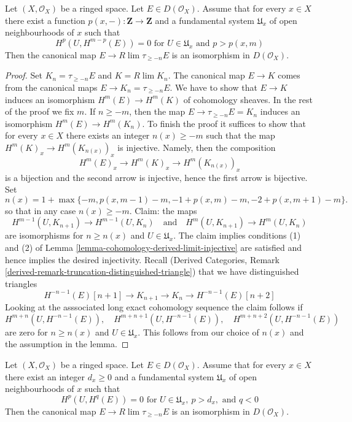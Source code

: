 \begin{lemma}
\label{lemma-is-limit-per-point}
Let $(X, \mathcal{O}_X)$ be a ringed space. Let $E \in D(\mathcal{O}_X)$.
Assume that for every $x \in X$ there exist
a function $p(x, -) : \mathbf{Z} \to \mathbf{Z}$ and
a fundamental system $\mathfrak{U}_x$ of open neighbourhoods of $x$
such that
$$
H^p(U, H^{m - p}(E)) = 0 \text{ for }
U \in \mathfrak{U}_x \text{ and } p > p(x, m)
$$
Then the canonical map $E \to R\lim \tau_{\geq -n} E$
is an isomorphism in $D(\mathcal{O}_X)$.
\end{lemma}

\begin{proof}
Set $K_n = \tau_{\geq -n}E$ and $K = R\lim K_n$.
The canonical map $E \to K$
comes from the canonical maps $E \to K_n = \tau_{\geq -n}E$.
We have to show that $E \to K$ induces an isomorphism
$H^m(E) \to H^m(K)$ of cohomology sheaves. In the rest of the
proof we fix $m$. If $n \geq -m$, then
the map $E \to \tau_{\geq -n}E = K_n$ induces an isomorphism
$H^m(E) \to H^m(K_n)$.
To finish the proof it suffices to show that for every $x \in X$
there exists an integer $n(x) \geq -m$ such that the map
$H^m(K)_x \to H^m(K_{n(x)})_x$ is injective. Namely, then
the composition
$$
H^m(E)_x \to H^m(K)_x \to H^m(K_{n(x)})_x
$$
is a bijection and the second arrow is injective, hence the
first arrow is bijective. Set
$$
n(x) = 1 + \max\{-m, p(x, m - 1) - m, -1 + p(x, m) - m, -2 + p(x, m + 1) - m\}.
$$
so that in any case $n(x) \geq -m$. Claim: the maps
$$
H^{m - 1}(U, K_{n + 1}) \to H^{m - 1}(U, K_n)
\quad\text{and}\quad
H^m(U, K_{n + 1}) \to H^m(U, K_n)
$$
are isomorphisms for $n \geq n(x)$ and $U \in \mathfrak{U}_x$.
The claim implies conditions
(1) and (2) of Lemma \ref{lemma-cohomology-derived-limit-injective}
are satisfied and hence implies the desired injectivity.
Recall (Derived Categories, Remark
\ref{derived-remark-truncation-distinguished-triangle})
that we have distinguished triangles
$$
H^{-n - 1}(E)[n + 1] \to
K_{n + 1} \to K_n \to H^{-n - 1}(E)[n + 2]
$$
Looking at the asssociated long exact cohomology sequence the claim follows if
$$
H^{m + n}(U, H^{-n - 1}(E)),\quad
H^{m + n + 1}(U, H^{-n - 1}(E)),\quad
H^{m + n + 2}(U, H^{-n - 1}(E))
$$
are zero for $n \geq n(x)$ and $U \in \mathfrak{U}_x$.
This follows from our choice of $n(x)$
and the assumption in the lemma.
\end{proof}

\begin{lemma}
\label{lemma-is-limit-spaltenstein}
\begin{reference}
\cite[Proposition 3.13]{Spaltenstein}
\end{reference}
Let $(X, \mathcal{O}_X)$ be a ringed space. Let $E \in D(\mathcal{O}_X)$.
Assume that for every $x \in X$ there exist an integer $d_x \geq 0$ and
a fundamental system $\mathfrak{U}_x$ of open neighbourhoods of $x$
such that
$$
H^p(U, H^q(E)) = 0 \text{ for }
U \in \mathfrak{U}_x,\ p > d_x, \text{ and }q < 0
$$
Then the canonical map $E \to R\lim \tau_{\geq -n} E$
is an isomorphism in $D(\mathcal{O}_X)$.
\end{lemma}

